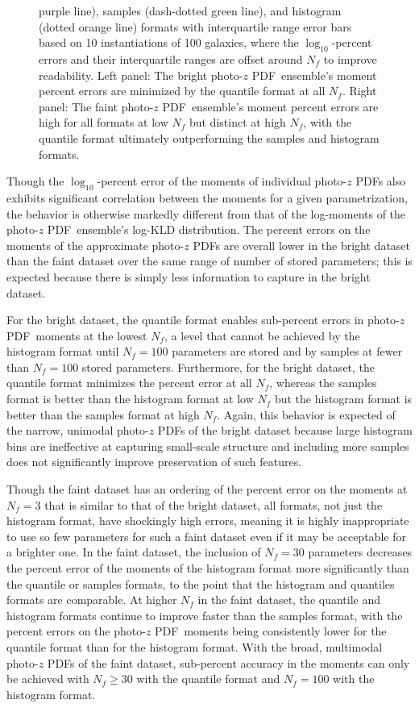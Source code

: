 \documentclass[\docopts]{\docclass}
\newcommand{\pz}{photo-$z$ PDF}
\newcommand{\mgdata}{bright\xspace}
\newcommand{\ssdata}{faint\xspace}
\begin{document}
\begin{figure}
\begin{center}
{purple line), samples (dash-dotted green line), and histogram (dotted orange 
line) formats with interquartile range error bars based on 10 instantiations of 
100 galaxies, where the $\log_{10}$-percent errors and their interquartile 
ranges are offset around $N_{f}$ to improve readability.
   Left panel: The \mgdata \pz\ ensemble's moment percent errors are minimized 
by the quantile format at all $N_{f}$.
   Right panel: The \ssdata \pz\ ensemble's moment percent errors are high for 
all formats at low $N_{f}$ but distinct at high $N_{f}$, with the quantile 
format ultimately outperforming the samples and histogram formats.
    \label{fig:pz_moment_errs}}
  \end{center}
\end{figure}

Though the $\log_{10}$-percent error of the moments of individual \pz s also 
exhibits significant correlation between the moments for a given 
parametrization, the behavior is otherwise markedly different from that of the 
log-moments of the \pz\ ensemble's log-KLD distribution.
The percent errors on the moments of the approximate \pz s are overall lower in 
the \mgdata dataset than the \ssdata dataset over the same range of number of 
stored parameters; this is expected because there is simply less information to 
capture in the \mgdata dataset.

For the \mgdata dataset, the quantile format enables sub-percent errors in \pz\ 
moments at the lowest $N_{f}$, a level that cannot be achieved by the histogram 
format until $N_{f}=100$ parameters are stored and by samples at fewer than 
$N_{f}=100$ stored parameters.
Furthermore, for the \mgdata dataset, the quantile format minimizes the percent 
error at all $N_{f}$, whereas the samples format is better than the histogram 
format at low $N_{f}$ but the histogram format is better than the samples 
format at high $N_{f}$.
Again, this behavior is expected of the narrow, unimodal \pz s of the \mgdata 
dataset because large histogram bins are ineffective at capturing small-scale 
structure and including more samples does not significantly improve 
preservation of such features.

Though the \ssdata dataset has an ordering of the percent error on the moments 
at $N_{f}=3$ that is similar to that of the \mgdata dataset, all formats, not 
just the histogram format, have shockingly high errors, meaning it is highly 
inappropriate to use so few parameters for such a faint dataset even if it may 
be acceptable for a brighter one.
In the \ssdata dataset, the inclusion of $N_{f}=30$ parameters decreases the 
percent error of the moments of the histogram format more significantly than 
the quantile or samples formats, to the point that the histogram and quantiles 
formats are comparable.
At higher $N_{f}$ in the \ssdata dataset, the quantile and histogram formats 
continue to improve faster than the samples format, with the percent errors on 
the \pz\ moments being consistently lower for the quantile format than for the 
histogram format.
With the broad, multimodal \pz s of the \ssdata dataset, sub-percent accuracy 
in the moments can only be achieved with $N_{f}\geq30$ with the quantile format 
and $N_{f}=100$ with the histogram format.
\end{document}
